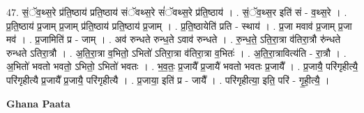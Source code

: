 \documentclass[17pt]{extarticle}
\begin{document}
47. सं॒ॅव॒थ्स॒रे प्र॑ति॒ष्ठाय॑ प्रति॒ष्ठाय॑ संॅवथ्स॒रे सं॑ॅवथ्स॒रे प्र॑ति॒ष्ठाय॑ । . सं॒ॅव॒थ्स॒र इति॑ सं - व॒थ्स॒रे । . प्र॒ति॒ष्ठाय॑ प्र॒जाम् प्र॒जाम् प्र॑ति॒ष्ठाय॑ प्रति॒ष्ठाय॑ प्र॒जाम् । . प्र॒ति॒ष्ठायेति॑ प्रति - स्थाय॑ । . प्र॒जा मवाव॑ प्र॒जाम् प्र॒जा मव॑ । . प्र॒जामिति॑ प्र - जाम् । . अव॑ रुन्धते रुन्ध॒ते ऽवाव॑ रुन्धते । . रु॒न्ध॒ते॒ ऽति॒रा॒त्रा व॑तिरा॒त्रौ रु॑न्धते रुन्धते ऽतिरा॒त्रौ । . अ॒ति॒रा॒त्रा व॒भितो॒ ऽभितो॑ ऽतिरा॒त्रा व॑तिरा॒त्रा व॒भितः॑ । . अ॒ति॒रा॒त्रावित्य॑ति - रा॒त्रौ । . अ॒भितो॑ भवतो भवतो॒ ऽभितो॒ ऽभितो॑ भवतः । . भ॒व॒तः॒ प्र॒जायै᳚ प्र॒जायै॑ भवतो भवतः प्र॒जायै᳚ । . प्र॒जायै॒ परि॑गृहीत्यै॒ परि॑गृहीत्यै प्र॒जायै᳚ प्र॒जायै॒ परि॑गृहीत्यै । . प्र॒जाया॒ इति॑ प्र - जायै᳚ । . परि॑गृहीत्या॒ इति॒ परि॑ - गृ॒ही॒त्यै॒ । \newline

\textbf{Ghana Paata } \newline
\end{document}
